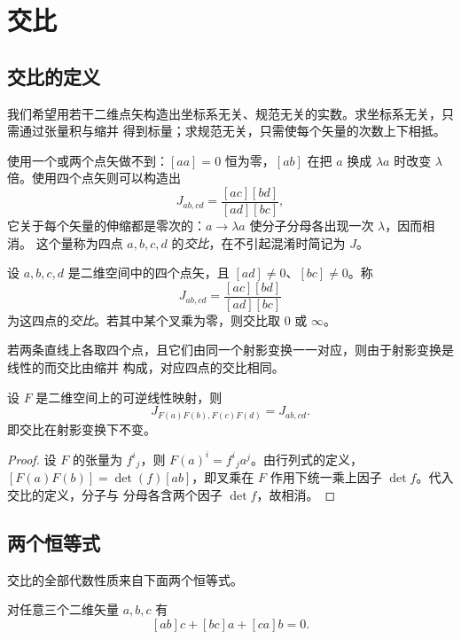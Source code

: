 \section{交比}

\subsection{交比的定义}

我们希望用若干二维点矢构造出坐标系无关、规范无关的实数。求坐标系无关，只需通过张量积与缩并
得到标量；求规范无关，只需使每个矢量的次数上下相抵。

使用一个或两个点矢做不到：$[aa]=0$ 恒为零，$[ab]$ 在把 $a$ 换成 $\lambda a$ 时改变 $\lambda$
倍。使用四个点矢则可以构造出
\[
J_{ab,cd}=\frac{[ac][bd]}{[ad][bc]} ,
\]
它关于每个矢量的伸缩都是零次的：$a\to\lambda a$ 使分子分母各出现一次 $\lambda$，因而相消。
这个量称为四点 $a,b,c,d$ 的\emph{交比}，在不引起混淆时简记为 $J$。

\begin{definition}[交比]
设 $a,b,c,d$ 是二维空间中的四个点矢，且
$[ad]\ne0$、$[bc]\ne0$。称
\[
J_{ab,cd}=\frac{[ac][bd]}{[ad][bc]}
\]
为这四点的\emph{交比}。若其中某个叉乘为零，则交比取 $0$ 或 $\infty$。
\end{definition}

若两条直线上各取四个点，且它们由同一个射影变换一一对应，则由于射影变换是线性的而交比由缩并
构成，对应四点的交比相同。

\begin{proposition}\label{prop:J-inv}
设 $F$ 是二维空间上的可逆线性映射，则
\[
J_{F(a)F(b),F(c)F(d)}=J_{ab,cd}.
\]
即交比在射影变换下不变。
\end{proposition}

\begin{proof}
设 $F$ 的张量为 ${f^i}_j$，则 $F(a)^i={f^i}_ja^j$。由行列式的定义，
$[F(a)F(b)]=\det(f)[ab]$，即叉乘在 $F$ 作用下统一乘上因子 $\det f$。代入交比的定义，分子与
分母各含两个因子 $\det f$，故相消。
\end{proof}

\subsection{两个恒等式}

交比的全部代数性质来自下面两个恒等式。

\begin{lemma}[二维叉乘的线性关系]\label{lem:cyc}
对任意三个二维矢量 $a,b,c$ 有
\[
[ab]c+[bc]a+[ca]b=0 .
\]
\end{lemma}

